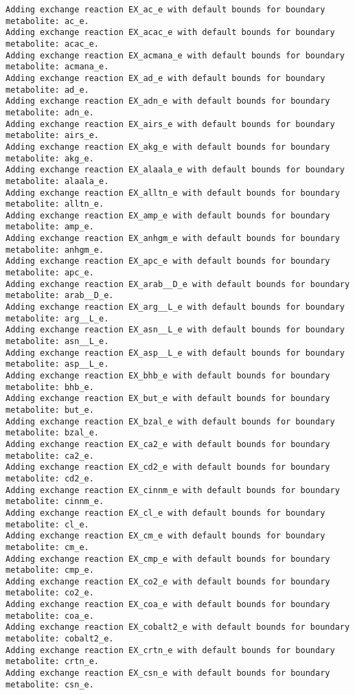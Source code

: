 \documentclass[
  letterpaper,
  DIV=11,
  numbers=noendperiod]{scrartcl}
\begin{document}
\begin{verbatim}
Adding exchange reaction EX_ac_e with default bounds for boundary metabolite: ac_e.
Adding exchange reaction EX_acac_e with default bounds for boundary metabolite: acac_e.
Adding exchange reaction EX_acmana_e with default bounds for boundary metabolite: acmana_e.
Adding exchange reaction EX_ad_e with default bounds for boundary metabolite: ad_e.
Adding exchange reaction EX_adn_e with default bounds for boundary metabolite: adn_e.
Adding exchange reaction EX_airs_e with default bounds for boundary metabolite: airs_e.
Adding exchange reaction EX_akg_e with default bounds for boundary metabolite: akg_e.
Adding exchange reaction EX_alaala_e with default bounds for boundary metabolite: alaala_e.
Adding exchange reaction EX_alltn_e with default bounds for boundary metabolite: alltn_e.
Adding exchange reaction EX_amp_e with default bounds for boundary metabolite: amp_e.
Adding exchange reaction EX_anhgm_e with default bounds for boundary metabolite: anhgm_e.
Adding exchange reaction EX_apc_e with default bounds for boundary metabolite: apc_e.
Adding exchange reaction EX_arab__D_e with default bounds for boundary metabolite: arab__D_e.
Adding exchange reaction EX_arg__L_e with default bounds for boundary metabolite: arg__L_e.
Adding exchange reaction EX_asn__L_e with default bounds for boundary metabolite: asn__L_e.
Adding exchange reaction EX_asp__L_e with default bounds for boundary metabolite: asp__L_e.
Adding exchange reaction EX_bhb_e with default bounds for boundary metabolite: bhb_e.
Adding exchange reaction EX_but_e with default bounds for boundary metabolite: but_e.
Adding exchange reaction EX_bzal_e with default bounds for boundary metabolite: bzal_e.
Adding exchange reaction EX_ca2_e with default bounds for boundary metabolite: ca2_e.
Adding exchange reaction EX_cd2_e with default bounds for boundary metabolite: cd2_e.
Adding exchange reaction EX_cinnm_e with default bounds for boundary metabolite: cinnm_e.
Adding exchange reaction EX_cl_e with default bounds for boundary metabolite: cl_e.
Adding exchange reaction EX_cm_e with default bounds for boundary metabolite: cm_e.
Adding exchange reaction EX_cmp_e with default bounds for boundary metabolite: cmp_e.
Adding exchange reaction EX_co2_e with default bounds for boundary metabolite: co2_e.
Adding exchange reaction EX_coa_e with default bounds for boundary metabolite: coa_e.
Adding exchange reaction EX_cobalt2_e with default bounds for boundary metabolite: cobalt2_e.
Adding exchange reaction EX_crtn_e with default bounds for boundary metabolite: crtn_e.
Adding exchange reaction EX_csn_e with default bounds for boundary metabolite: csn_e.

\end{verbatim}
\end{document}
